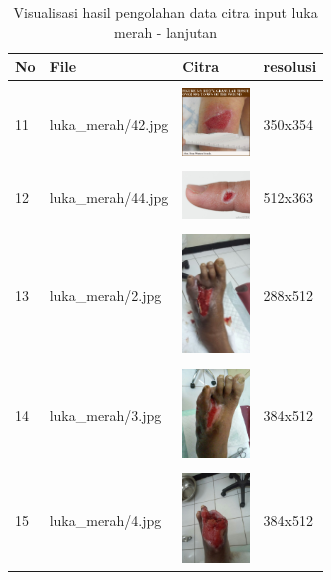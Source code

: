 \begin{table}[H]
	\centering
	\caption{Visualisasi hasil pengolahan data citra input luka merah - lanjutan}
	\label{tabel_input_9}
	\begin{tabular}{|m{0.2in}|m{1.2in}|m{0.7in}|m{0.7in}|}
		\hline
		\textbf{No} & \textbf{File} & \textbf{Citra} & \textbf{resolusi} \\
		\hline
		
		& &  &  \\
		11& 
		luka\_merah/42.jpg &
		\includegraphics[width=0.7in]{gambar/dataset_citra/luka_merah/bahan/42.jpg}&
		350x354\\
		\hline
		
		& &  &  \\
		12& 
		luka\_merah/44.jpg &
		\includegraphics[width=0.7in]{gambar/dataset_citra/luka_merah/bahan/44.jpg}&
		512x363\\
		\hline
		
		& &  &  \\
		13& 
		luka\_merah/2.jpg &
		\includegraphics[width=0.7in]{gambar/dataset_citra/luka_merah/bahan/2.jpg}&
		288x512\\
		\hline
		
		& &  &  \\
		14& 
		luka\_merah/3.jpg &
		\includegraphics[width=0.7in]{gambar/dataset_citra/luka_merah/bahan/3.jpg}&
		384x512\\
		\hline

		& &  &  \\
		15 & 
		luka\_merah/4.jpg &
		\includegraphics[width=0.7in]{gambar/dataset_citra/luka_merah/bahan/4.jpg}&
		384x512\\
		\hline
		

\end{tabular}
\end{table}
